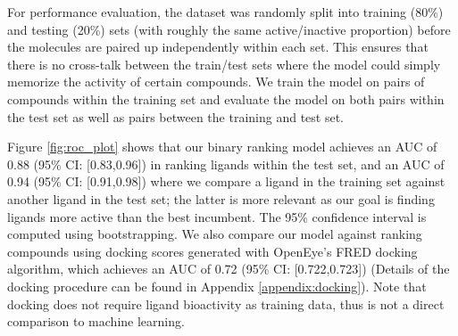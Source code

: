 

For performance evaluation, the dataset was randomly split into training (80\%) and testing (20\%) sets (with roughly the same active/inactive proportion) before the molecules are paired up independently within each set. This ensures that there is no cross-talk between the train/test sets where the model could simply memorize the activity of certain compounds. We train the model on pairs of compounds within the training set and evaluate the model on both pairs within the test set as well as pairs between the training and test set.


Figure \ref{fig:roc_plot} shows that our binary ranking model achieves an AUC of 0.88 (95\% CI: [0.83,0.96]) in ranking ligands within the test set, and an AUC of 0.94 (95\% CI: [0.91,0.98]) where we compare a ligand in the training set against another ligand in the test set; the latter is more relevant as our goal is finding ligands more active than the best incumbent. The 95\% confidence interval is computed using bootstrapping. We also compare our model against ranking compounds using docking scores generated with OpenEye's FRED docking algorithm, which achieves an AUC of 0.72 (95\% CI: [0.722,0.723]) (Details of the docking procedure can be found in Appendix \ref{appendix:docking}). Note that docking does not require ligand bioactivity as training data, thus is not a direct comparison to machine learning.

